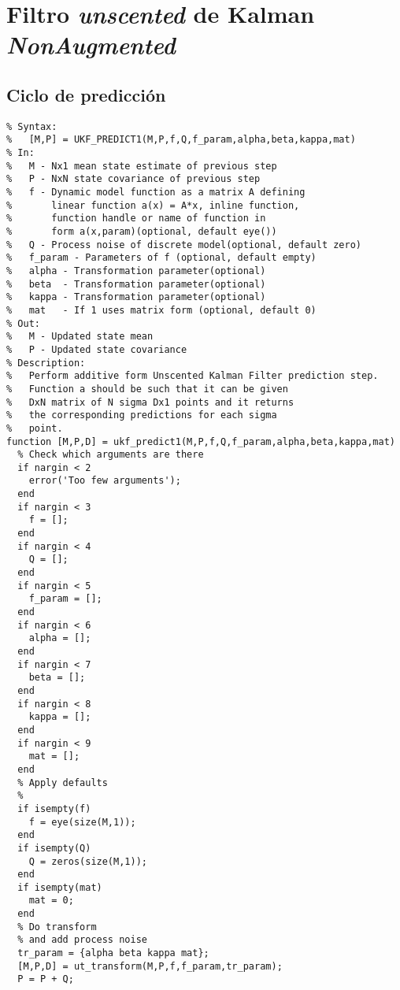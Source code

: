 \section{Filtro \textit{unscented} de Kalman \textit{NonAugmented}}
\subsection{Ciclo de predicción}
\lstset{language=Matlab, breaklines=true, basicstyle=\footnotesize}
\lstset{numbers=left, numberstyle=\tiny, stepnumber=1, numbersep=-2pt}
\begin{lstlisting}[frame=single]
%UKF_PREDICT1  Nonaugmented (Additive) UKF prediction step
% Syntax:
%   [M,P] = UKF_PREDICT1(M,P,f,Q,f_param,alpha,beta,kappa,mat)
% In:
%   M - Nx1 mean state estimate of previous step
%   P - NxN state covariance of previous step
%   f - Dynamic model function as a matrix A defining
%       linear function a(x) = A*x, inline function,
%       function handle or name of function in
%       form a(x,param)(optional, default eye())
%   Q - Process noise of discrete model(optional, default zero)
%   f_param - Parameters of f (optional, default empty)
%   alpha - Transformation parameter(optional)
%   beta  - Transformation parameter(optional)
%   kappa - Transformation parameter(optional)
%   mat   - If 1 uses matrix form (optional, default 0)
% Out:
%   M - Updated state mean
%   P - Updated state covariance
% Description:
%   Perform additive form Unscented Kalman Filter prediction step.
%   Function a should be such that it can be given
%   DxN matrix of N sigma Dx1 points and it returns 
%   the corresponding predictions for each sigma
%   point. 
function [M,P,D] = ukf_predict1(M,P,f,Q,f_param,alpha,beta,kappa,mat)
  % Check which arguments are there
  if nargin < 2
    error('Too few arguments');
  end
  if nargin < 3
    f = [];
  end
  if nargin < 4
    Q = [];
  end
  if nargin < 5
    f_param = [];
  end
  if nargin < 6
    alpha = [];
  end
  if nargin < 7
    beta = [];
  end
  if nargin < 8
    kappa = [];
  end
  if nargin < 9
    mat = [];
  end
  % Apply defaults
  %
  if isempty(f)
    f = eye(size(M,1));
  end
  if isempty(Q)
    Q = zeros(size(M,1));
  end
  if isempty(mat)
    mat = 0;
  end
  % Do transform
  % and add process noise
  tr_param = {alpha beta kappa mat};
  [M,P,D] = ut_transform(M,P,f,f_param,tr_param);
  P = P + Q;
\end{lstlisting}
